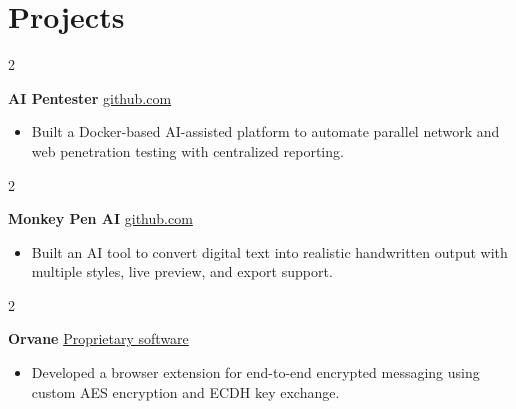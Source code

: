 \documentclass[10pt, a4paper]{article}
\newenvironment{highlights}{
    \begin{itemize}[
        topsep=0.10 cm,
        parsep=0.10 cm,
        partopsep=0pt,
        itemsep=0pt,
        leftmargin=0 cm + 10pt
    ]
}{
    \end{itemize}
} %
\newenvironment{twocolentry}[2][]{
    \onecolentry
    \def\secondColumn{#2}
    \setcolumnwidth{\fill, 4.5 cm}
    \begin{paracol}{2}
}{
    \switchcolumn \raggedleft \secondColumn
    \end{paracol}
    \endonecolentry
} %
\begin{document}
    \section{Projects}

            \begin{twocolentry}{
            \href{https://github.com/TimsTittus/AI-Pentester}{github.com}
        }
            \textbf{AI Pentester}\end{twocolentry}

        \vspace{0.01 cm}
        
            \begin{highlights}
                \item Built a Docker-based AI-assisted platform to automate parallel network and web penetration testing with centralized reporting.
            \end{highlights}

            \begin{twocolentry}{
            \href{https://github.com/TimsTittus/AI-Pentester}{github.com}
        }
            \textbf{Monkey Pen AI}\end{twocolentry}

        \vspace{0.01 cm}
        
            \begin{highlights}
                \item Built an AI tool to convert digital text into realistic handwritten output with multiple styles, live preview, and export support.
            \end{highlights}
            
            \begin{twocolentry}{
            \href{https://github.com/TimsTittus/Orvane}{Proprietary software}
        }
            \textbf{Orvane}\end{twocolentry}

        \vspace{0.01 cm}
        
            \begin{highlights}
                \item Developed a browser extension for end-to-end encrypted messaging using custom AES encryption and ECDH key exchange.

            \end{highlights}

        \vspace{0.01 cm}
        
\end{document}
